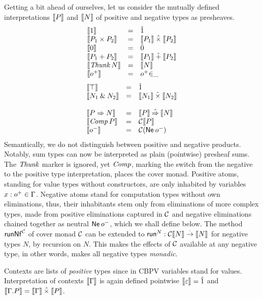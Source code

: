 \documentclass[sigplan,screen]{acmart}
\begin{document}
Getting a bit ahead of ourselves, let us consider the
mutually defined interpretations
$\den P$ and $\den N$ of positive and negative types as presheaves.
\[
\begin{array}{lcl}
  \den{\tyone} & = & \hatone \\
  \den{P_1 \times P_2} & = & \den{P_1} \hattimes \den{P_2} \\
  \den{\tyzero} & = & \hatzero \\
  \den{P_1 + P_2} & = & \den{P_1} \hatplus \den{P_2} \\
  \den{\Thunk N} & = & \den N \\
  \den{\patom} & = & \patom{\in}\_ \\
\end{array}
\]
\[
\begin{array}{lcl}
  \den{\top} & = & \hatone \\
  \den{N_1 \ntimes N_2} & = & \den{N_1} \hattimes \den{N_2} \\
  \\
  \den{P \To N} & = & \den P \hatto \den N \\
  \den{\Comp P} & = & \C \den P \\
  \den{\natom}  & = & \C (\tNe\, \natom) \\
\end{array}
\]
Semantically, we do not distinguish between positive and negative
products.  Notably, sum types can now be interpreted as plain
(pointwise) presheaf
sums.  The $\tThunk$ marker is ignored, yet $\tComp$, marking the
switch from the negative to the positive type interpretation, places
the cover monad.  Positive atoms, standing for value types without
constructors, are only inhabited by variables $x : \patom \in \Gamma$.
Negative atoms stand for computation types without own eliminations,
thus, their inhabitants stem only from eliminations of more complex
types, made from positive eliminations captured in $\C$ and negative
eliminations chained together as neutral $\tNe\,\natom$, which we
shall define below.
The method $\trunNf[\C]$ of cover monad $\C$ can be extended to
$\trun^N : \C \den N \todot \den N$ for negative types $N$, by recursion
on $N$.
This makes the effects of $\C$ available at any negative type,
in other words, makes all negative types \emph{monadic}.

Contexts are lists of \emph{positive} types since in CBPV variables stand
for values.  Interpretation of contexts $\den \Gamma$ is again defined
pointwise $\den \cempty = \hatone$ and
$\den{\cext \Gamma P} = \den \Gamma \hattimes \den P$.
\end{document}
